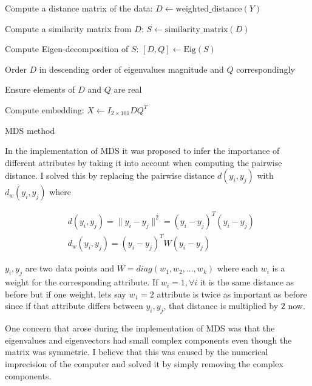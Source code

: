 \begin{algorithm}[H]
\SetAlgoLined
{}
  Compute a distance matrix of the data: $D \gets \text{weighted\_distance} (Y) $

  Compute a similarity matrix from $D$: $S \gets \text{similarity\_matrix} (D) $

  Compute Eigen-decomposition of $S$: $[D,Q] \gets \text{Eig}(S)$

  Order $D$ in descending order of eigenvalues magnitude and $Q$ correspondingly

  Ensure elements of $D$ and $Q$ are real

  Compute embedding: $X \gets I_{2\times 101}D Q^T$

  \caption{MDS method}
\end{algorithm}


In the implementation of MDS it was proposed to infer the importance of different attributes by taking it into account when computing the pairwise distance. I solved this by replacing the pairwise distance $d(y_i, y_j)$ with $d_w(y_i, y_j)$ where

\begin{align*}
  & d(y_i, y_j) = \|y_i -y_j \|^2 = (y_i-y_j)^T(y_i-y_j)\\
  & d_w(y_i, y_j) = (y_i-y_j)^T W (y_i-y_j)
\end{align*}

 $y_i, y_j$ are two data points and $W = diag(w_1,w_2,..., w_k)$ where each $w_i$ is a weight for the corresponding attribute. If $w_i = 1, \forall i$ it is the same distance as before but if one weight, lets say $w_1 = 2$ attribute is twice as important as before since if that attribute differs between $y_i, y_j$, that distance is multiplied by $2$ now.

One concern that arose during the implementation of MDS was that the eigenvalues and eigenvectors had small complex components even though the matrix was symmetric. I believe that this was caused by the numerical imprecision of the computer and solved it by simply removing the complex components.

